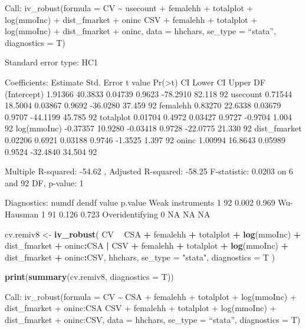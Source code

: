 \documentclass[
]{article}
\newenvironment{Shaded}{\begin{snugshade}}{\end{snugshade}}
\newcommand{\DataTypeTok}[1]{\textcolor[rgb]{0.13,0.29,0.53}{#1}}
\newcommand{\KeywordTok}[1]{\textcolor[rgb]{0.13,0.29,0.53}{\textbf{#1}}}
\newcommand{\NormalTok}[1]{#1}
\newcommand{\OperatorTok}[1]{\textcolor[rgb]{0.81,0.36,0.00}{\textbf{#1}}}
\newcommand{\StringTok}[1]{\textcolor[rgb]{0.31,0.60,0.02}{#1}}
\begin{document}
Call: iv\_robust(formula = CV \textasciitilde{} usecount + femalehh +
totalplot + log(mmoInc) + dist\_fmarket + oninc \textbar{} CSV +
femalehh + totalplot + log(mmoInc) + dist\_fmarket + oninc, data =
hhchars, se\_type = ``stata'', diagnostics = T)

Standard error type: HC1

Coefficients: Estimate Std. Error t value
Pr(\textgreater\textbar t\textbar) CI Lower CI Upper DF (Intercept)
1.91366 40.3833 0.04739 0.9623 -78.2910 82.118 92 usecount 0.71544
18.5004 0.03867 0.9692 -36.0280 37.459 92 femalehh 0.83270 22.6338
0.03679 0.9707 -44.1199 45.785 92 totalplot 0.01704 0.4972 0.03427
0.9727 -0.9704 1.004 92 log(mmoInc) -0.37357 10.9280 -0.03418 0.9728
-22.0775 21.330 92 dist\_fmarket 0.02206 0.6921 0.03188 0.9746 -1.3525
1.397 92 oninc 1.00994 16.8643 0.05989 0.9524 -32.4840 34.504 92

Multiple R-squared: -54.62 , Adjusted R-squared: -58.25 F-statistic:
0.0203 on 6 and 92 DF, p-value: 1

Diagnostics: numdf dendf value p.value Weak instruments 1 92 0.002 0.969
Wu-Hausman 1 91 0.126 0.723 Overidentifying 0 NA NA NA

\begin{Shaded}
\begin{Highlighting}[]
\NormalTok{cv.remiv8 <-}
\StringTok{  }\KeywordTok{iv_robust}\NormalTok{(}
\NormalTok{    CV }\OperatorTok{~}\StringTok{ }\NormalTok{CSA }\OperatorTok{+}\StringTok{ }\NormalTok{femalehh }\OperatorTok{+}\StringTok{ }\NormalTok{totalplot }\OperatorTok{+}\StringTok{ }\KeywordTok{log}\NormalTok{(mmoInc) }\OperatorTok{+}\StringTok{ }\NormalTok{dist_fmarket }\OperatorTok{+}\StringTok{ }\NormalTok{oninc}\OperatorTok{:}\NormalTok{CSA }\OperatorTok{|}
\StringTok{      }\NormalTok{CSV }\OperatorTok{+}\StringTok{ }\NormalTok{femalehh }\OperatorTok{+}\StringTok{ }\NormalTok{totalplot }\OperatorTok{+}\StringTok{ }\KeywordTok{log}\NormalTok{(mmoInc) }\OperatorTok{+}\StringTok{ }\NormalTok{dist_fmarket }\OperatorTok{+}\StringTok{ }\NormalTok{oninc}\OperatorTok{:}\NormalTok{CSV,}
\NormalTok{    hhchars,}
    \DataTypeTok{se_type =} \StringTok{"stata"}\NormalTok{,}
    \DataTypeTok{diagnostics =}\NormalTok{ T}
\NormalTok{  )}

\KeywordTok{print}\NormalTok{(}\KeywordTok{summary}\NormalTok{(cv.remiv8, }\DataTypeTok{diagnostics =}\NormalTok{ T))}
\end{Highlighting}
\end{Shaded}

Call: iv\_robust(formula = CV \textasciitilde{} CSA + femalehh +
totalplot + log(mmoInc) + dist\_fmarket + oninc:CSA \textbar{} CSV +
femalehh + totalplot + log(mmoInc) + dist\_fmarket + oninc:CSV, data =
hhchars, se\_type = ``stata'', diagnostics = T)
\end{document}
